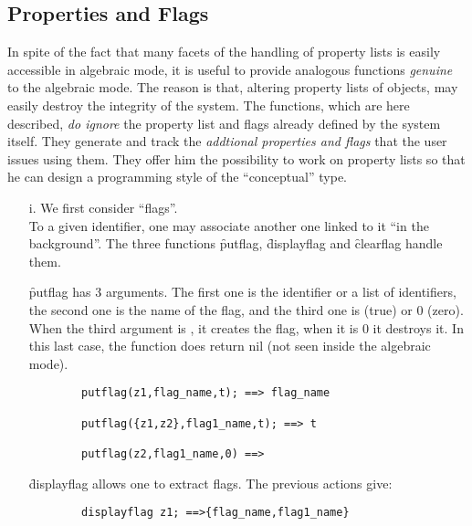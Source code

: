\subsection{Properties and Flags}
In spite of the fact that many facets of the handling of
property lists is easily accessible in algebraic mode, it is useful to
provide analogous functions \emph{genuine} to the algebraic mode. The reason is
that, altering property lists of objects, may easily destroy the integrity
of the system. The functions, which are here described, \emph{do ignore}
the property list and flags already defined by the system itself. They
generate and track the \emph{addtional properties and flags} that the user
issues using them. They offer him
the  possibility to work on property lists so
that he can design a programming style of the ``conceptual'' type.
\begin{itemize}
\item[i.] We first consider ``flags''. \\
\hypertarget{operator:PUTFLAG}{}
\hypertarget{operator:DISPLAYFLAG}{}
\hypertarget{operator:CLEARFLAG}{}
To a given identifier, one may
associate another one linked to it ``in the background''. The  three
functions \f{putflag}, \f{displayflag} and \f{clearflag} handle them.

\f{putflag} has 3 arguments. The first one is the identifier or a list
of identifiers, the second one is the name of the flag,
and the third one is  (true) or 0 (zero).
When the third argument is , it creates the flag, when it is 0 it
destroys it. In this last case, the function does return nil (not seen 
inside the algebraic mode).
\begin{verbatim}
        putflag(z1,flag_name,t); ==> flag_name

        putflag({z1,z2},flag1_name,t); ==> t

        putflag(z2,flag1_name,0) ==>
\end{verbatim}
\f{displayflag} allows one to extract flags. The previous actions give:
\begin{verbatim}
        displayflag z1; ==>{flag_name,flag1_name}


\end{verbatim}
\end{itemize}
